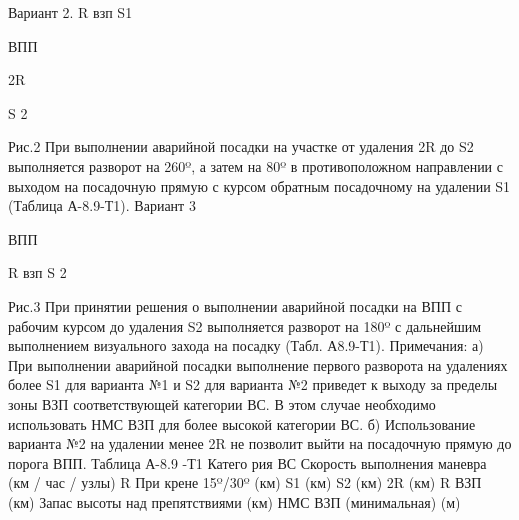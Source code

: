 Вариант 2.                     
                                                    R взп
                                                                                  S1
                                                               

                                                                ВПП
                                                      
                                                                                
                                                                                       2R
                                                                                     
                                                                                               S 2
                                                                                      


Рис.2
При выполнении аварийной посадки на участке от удаления 2R до S2 выполняется разворот на 260º, а затем на 80º в противоположном направлении с выходом на посадочную прямую с курсом обратным посадочному на удалении S1 (Таблица А-8.9-Т1).
Вариант 3 




                      


                                                               ВПП

                                                                                                             
                                                                                                                                                                     
                             R взп
                                                                                  S 2
                                                                                      
                                            
Рис.3
При принятии решения о выполнении аварийной посадки на ВПП с рабочим курсом до удаления S2 выполняется разворот на 180º с дальнейшим выполнением визуального захода на посадку (Табл. А8.9-Т1).
Примечания:
а)	При выполнении аварийной посадки выполнение первого разворота на удалениях более S1 для варианта №1 и S2 для варианта №2 приведет к выходу за пределы зоны ВЗП соответствующей категории ВС. В этом случае необходимо использовать НМС ВЗП для более высокой категории ВС.
б)	Использование варианта №2 на удалении менее 2R не позволит выйти на посадочную прямую до порога ВПП.                                                                                                                                     Таблица А-8.9 -Т1
Катего
рия
ВС	Скорость
выполнения
маневра
(км / час / узлы)	R
При крене
15º/30º
(км)	S1
(км)	S2
(км)	2R
(км)	R
ВЗП
(км)	Запас высоты
над
препятствиями
(км)	НМС ВЗП
(минимальная)
(м)		
										
